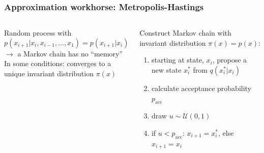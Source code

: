 \documentclass[t,aspectratio=169]{beamer}
\begin{document}
\begin{frame}
  \frametitle{Approximation workhorse: Metropolis-Hastings}
  \begin{columns}
  \begin{column}{0.48\textwidth}
  \begin{tcolorbox}[fontupper=\small, title=Markov chain]
    Random process with
    \begin{equation*}
      p(x_{i+1}|x_i, x_{i-1}, \ldots, x_1) = p(x_{i+1}|x_i)
    \end{equation*}
    $\rightarrow$ a Markov chain has no ``memory''\\
    
    In some conditions: converges to a unique invariant distribution $\pi(x)$
  \end{tcolorbox}  
\end{column}
\begin{column}{0.48\textwidth}  
  \begin{tcolorbox}[fontupper=\small, title=Metropolis-Hastings algorithm]
    Construct Markov chain with invariant distribution $\pi(x)=p(x)$:
    \begin{enumerate}
    \item starting at state, $x_i$, propose a new state $x_i^*$ from $q(x_i^*|x_i)$
    \item calculate acceptance probability $p_{\mathrm{acc}}$
    \item draw $u \sim \mathcal U(0,1)$
    \item if $u < p_{\mathrm{acc}}$: $x_{i+1} = x_i^*$, else $x_{i+1} = x_i$
    \end{enumerate}
  \end{tcolorbox}
\end{column}
\end{columns}
\end{frame}
\end{document}
